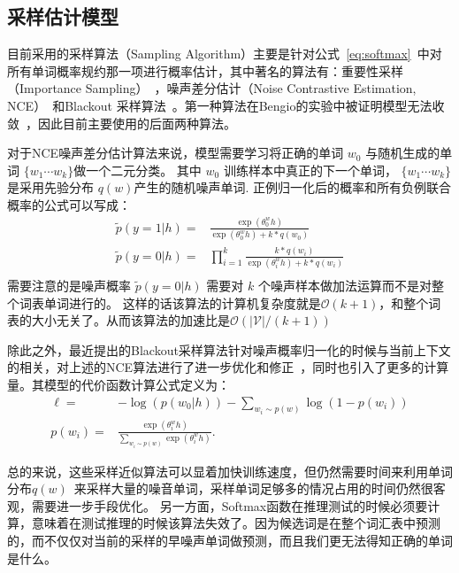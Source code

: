 \subsection{采样估计模型}
目前采用的采样算法（Sampling Algorithm）主要是针对公式~\ref{eq:softmax}~中对所有单词概率规约那一项进行概率估计，其中著名的算法有：重要性采样（Importance Sampling）~，噪声差分估计（Noise Contrastive Estimation, NCE）~和Blackout 采样算法~。第一种算法在Bengio的实验中被证明模型无法收敛~，因此目前主要使用的后面两种算法。

对于NCE噪声差分估计算法来说，模型需要学习将正确的单词 $w_0$ 与随机生成的单词 $\{w_1\cdots w_k\}$做一个二元分类。 其中 $w_0$ 训练样本中真正的下一个单词， $\{w_1\cdots w_k\}$ 是采用先验分布  $q(w)$产生的随机噪声单词. 正例归一化后的概率和所有负例联合概率的公式可以写成：
\begin{equation}\label{equ:nce}
\begin{split}
  \tilde{p}(y=1|h)=&\frac{\exp( \theta^w_0 h)}{ \exp( \theta^w_0 h)+k *q(w_0)}\\
  \tilde{p}(y=0|h)=&\prod_{i=1}^{k}\frac{k *q(w_i)}{\exp( \theta^w_i h)+k *q(w_i)}\\
\end{split}
\end{equation}
需要注意的是噪声概率 $\tilde{p}(y=0|h)$ 需要对 $k$ 个噪声样本做加法运算而不是对整个词表单词进行的。 这样的话该算法的计算机复杂度就是$\mathcal{O}(k+1)$，和整个词表的大小无关了。从而该算法的加速比是$\mathcal{O}(\mathcal{|V|}/(k+1))$

除此之外，最近提出的Blackout采样算法针对噪声概率归一化的时候与当前上下文的相关，对上述的NCE算法进行了进一步优化和修正~，同时也引入了更多的计算量。其模型的代价函数计算公式定义为：
\begin{equation}
\begin{split}
  \ell=&-\log(p(w_0|h)) - \sum_{w_i \sim p(w)} \log(1 - p(w_i))\\
p(w_i) =& \frac{\exp(\theta^w_i h)}{\sum_{w_i \sim p(w)} \exp(\theta^w_i h)}.
\end{split}
\end{equation}

总的来说，这些采样近似算法可以显着加快训练速度，但仍然需要时间来利用单词分布$q(w)$~来采样大量的噪音单词，采样单词足够多的情况占用的时间仍然很客观，需要进一步手段优化。 另一方面，Softmax函数在推理测试的时候必须要计算，意味着在测试推理的时候该算法失效了。因为候选词是在整个词汇表中预测的，而不仅仅对当前的采样的早噪声单词做预测，而且我们更无法得知正确的单词是什么。

